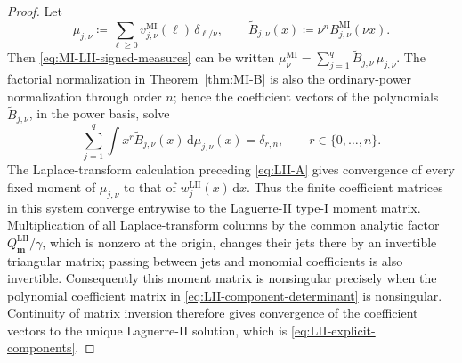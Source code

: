 \documentclass[10pt]{amsart}
\newcommand{\dd}{\,\mathrm d}
\newcommand{\mm}{\boldsymbol m}
\theoremstyle{plain}
\theoremstyle{definition}
\theoremstyle{remark}
\begin{document}
\begin{proof}
Let
\[
 \mu_{j,\nu}\coloneq\sum_{\ell\ge0}
 v_{j,\nu}^{\mathrm{MI}}(\ell)\,\delta_{\ell/\nu},
 \qquad
 \widetilde B_{j,\nu}(x)\coloneq
 \nu^nB_{j,\nu}^{\mathrm{MI}}(\nu x).
\]
Then \eqref{eq:MI-LII-signed-measures} can be written
\(\mu_{\nu}^{\mathrm{MI}}
=\sum_{j=1}^q\widetilde B_{j,\nu}\,\mu_{j,\nu}\).
The factorial normalization in Theorem~\ref{thm:MI-B} is also the
ordinary-power normalization through order \(n\); hence the coefficient
vectors of the polynomials \(\widetilde B_{j,\nu}\), in the power basis,
solve
\[
 \sum_{j=1}^q\int x^r\widetilde B_{j,\nu}(x)
 \dd\mu_{j,\nu}(x)=\delta_{r,n},
 \qquad r\in\{0,\ldots,n\}.
\]
The Laplace-transform calculation preceding
\eqref{eq:LII-A} gives convergence of every fixed moment of
\(\mu_{j,\nu}\) to that of
\(w_j^{\mathrm{LII}}(x)\dd x\).  Thus the finite coefficient matrices
in this system converge entrywise to the Laguerre-II type-I moment
matrix. Multiplication of all Laplace-transform columns by the common
analytic factor \(Q_{\mm}^{\mathrm{LII}}/\gamma\), which is nonzero at
the origin, changes their jets there by an invertible triangular matrix;
passing between jets and monomial coefficients is also invertible.
Consequently this moment matrix is nonsingular precisely when the
polynomial coefficient matrix in
\eqref{eq:LII-component-determinant} is nonsingular. Continuity of matrix inversion
therefore gives convergence of the coefficient vectors to the unique
Laguerre-II solution, which is
\eqref{eq:LII-explicit-components}.
\end{proof}
\end{document}
